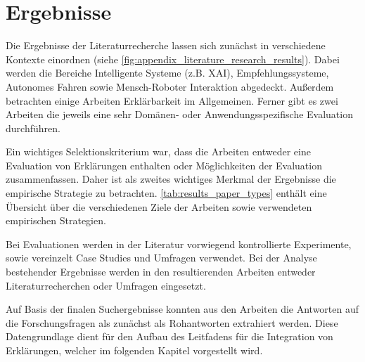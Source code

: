 \newpage

\section{Ergebnisse}

Die Ergebnisse der Literaturrecherche lassen sich zunächst in verschiedene Kontexte einordnen (siehe \autoref{fig:appendix_literature_research_results}). Dabei werden die Bereiche Intelligente Systeme (z.B. XAI), Empfehlungssysteme, Autonomes Fahren sowie Mensch-Roboter Interaktion abgedeckt. Außerdem betrachten einige Arbeiten Erklärbarkeit im Allgemeinen. Ferner gibt es zwei Arbeiten die jeweils eine sehr Domänen- oder Anwendungsspezifische Evaluation durchführen.

Ein wichtiges Selektionskriterium war, dass die Arbeiten entweder eine Evaluation von Erklärungen enthalten oder Möglichkeiten der Evaluation zusammenfassen. Daher ist als zweites wichtiges Merkmal der Ergebnisse die empirische Strategie zu betrachten. \autoref{tab:results_paper_types} enthält eine Übersicht über die verschiedenen Ziele der Arbeiten sowie verwendeten empirischen Strategien.

Bei Evaluationen werden in der Literatur vorwiegend kontrollierte Experimente, sowie vereinzelt Case Studies und Umfragen verwendet. Bei der Analyse bestehender Ergebnisse werden in den resultierenden Arbeiten entweder Literaturrecherchen oder Umfragen eingesetzt.

Auf Basis der finalen Suchergebnisse konnten aus den Arbeiten die Antworten auf die Forschungsfragen als zunächst als Rohantworten extrahiert werden. Diese Datengrundlage dient für den Aufbau des Leitfadens für die Integration von Erklärungen, welcher im folgenden Kapitel vorgestellt wird.

